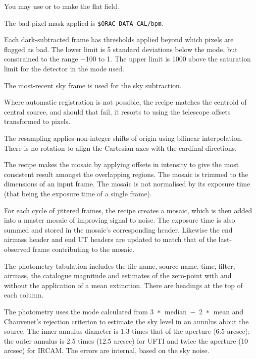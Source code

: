 \documentclass[twoside,11pt,nolof]{starlink}
\providecommand{\lsk}{\raisebox{-0.4ex}{\rm *}}
\begin{document}
{{{         \sstitem
         You may use  or  to make the flat field.

         \sstitem
         The bad-pixel mask applied is {\tt\$ORAC\_DATA\_CAL/bpm}.

         \sstitem
         Each dark-subtracted frame has thresholds applied beyond which
         pixels are flagged as bad.  The lower limit is 5 standard
         deviations below the mode, but constrained to the range $-$100 to 1.
         The upper limit is 1000 above the saturation limit for the detector
         in the mode used.

         \sstitem
         The most-recent sky frame is used for the sky subtraction.

         \sstitem
         Where automatic registration is not possible, the recipe matches
         the centroid of central source, and should that fail, it resorts
         to using the telescope offsets transformed to pixels.

         \sstitem
         The resampling applies non-integer shifts of origin using
         bilinear interpolation.  There is no rotation to align the
         Cartesian axes with the cardinal directions.

         \sstitem
         The recipe makes the mosaic by applying offsets in intensity to
         give the most consistent result amongst the overlapping regions.
         The mosaic is trimmed to the dimensions of an input frame.  The
         mosaic is not normalised by its exposure time (that being the
         exposure time of a single frame).

         \sstitem
         For each cycle of jittered frames, the recipe creates a mosaic,
         which is then added into a master mosaic of improving signal to
         noise.  The exposure time is also summed and stored in the
	 mosaic's corresponding header.  Likewise the end airmass
	 header and end UT headers are updated to match that of the
	 last-observed frame contributing to the mosaic.

         \sstitem
         The photometry tabulation includes the file name, source
         name, time, filter, airmass, the catalogue magnitude and
         estimates of the zero-point with and without the application
         of a mean extinction.  There are headings at the top of each
         column.

         \sstitem
         The photometry uses the mode calculated from
         \mbox{3 $\lsk$ median $-$ 2 $\lsk$ mean} and Chauvenet's
         rejection criterion to estimate the sky level in an annulus
         about the source.  The inner annulus diameter is 1.3 times
         that of the aperture (6.5 arcsec); the outer annulus is 2.5
         times (12.5 arcsec) for UFTI and twice the aperture (10 arcsec)
         for IRCAM. The errors are internal, based on the sky noise.

}}}
\end{document}

